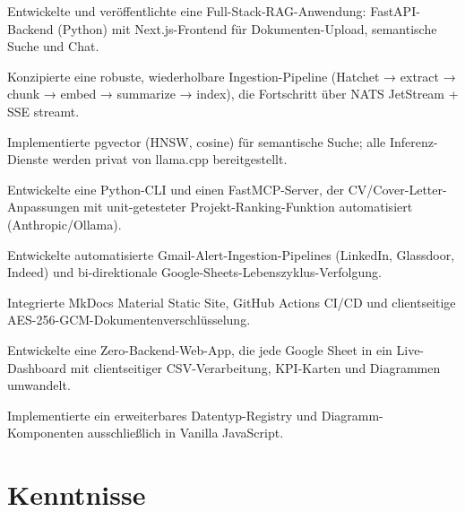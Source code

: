 \documentclass[10pt,a4paper]{resume}
\begin{document}
\bullets
  \item Entwickelte und veröffentlichte eine Full-Stack-RAG-Anwendung: FastAPI-Backend (Python) mit Next.js-Frontend für Dokumenten-Upload, semantische Suche und Chat.
  \item Konzipierte eine robuste, wiederholbare Ingestion-Pipeline (Hatchet → extract → chunk → embed → summarize → index), die Fortschritt über NATS JetStream + SSE streamt.
  \item Implementierte pgvector (HNSW, cosine) für semantische Suche; alle Inferenz-Dienste werden privat von llama.cpp bereitgestellt.
\bulletsend
\vspace{1.0pt}
\bullets
  \item Entwickelte eine Python-CLI und einen FastMCP-Server, der CV/Cover-Letter-Anpassungen mit unit-getesteter Projekt-Ranking-Funktion automatisiert (Anthropic/Ollama).
  \item Entwickelte automatisierte Gmail-Alert-Ingestion-Pipelines (LinkedIn, Glassdoor, Indeed) und bi-direktionale Google-Sheets-Lebenszyklus-Verfolgung.
  \item Integrierte MkDocs Material Static Site, GitHub Actions CI/CD und clientseitige AES-256-GCM-Dokumentenverschlüsselung.
\bulletsend
\vspace{1.0pt}
\bullets
  \item Entwickelte eine Zero-Backend-Web-App, die jede Google Sheet in ein Live-Dashboard mit clientseitiger CSV-Verarbeitung, KPI-Karten und Diagrammen umwandelt.
  \item Implementierte ein erweiterbares Datentyp-Registry und Diagramm-Komponenten ausschließlich in Vanilla JavaScript.
\bulletsend

\section{Kenntnisse}
\end{document}
